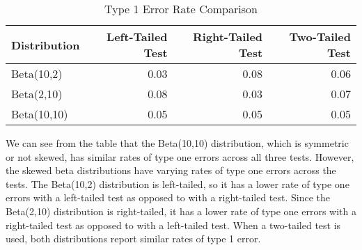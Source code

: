 \documentclass{article}\usepackage[]{graphicx}\usepackage[]{xcolor}
\begin{document}
\begin{enumerate}
\begin{enumerate}
\begin{table}[H]
\centering
\begingroup\small
\begin{tabular}{lrrr}
  \hline
Distribution & Left-Tailed Test & Right-Tailed Test & Two-Tailed Test \\ 
  \hline
Beta(10,2) & 0.03 & 0.08 & 0.06 \\ 
  Beta(2,10) & 0.08 & 0.03 & 0.07 \\ 
  Beta(10,10) & 0.05 & 0.05 & 0.05 \\ 
   \hline
\end{tabular}
\endgroup
\caption{Type 1 Error Rate Comparison} 
\end{table}

We can see from the table that the Beta(10,10) distribution, which is symmetric or not skewed, has similar rates of type one errors across all three tests. However, the skewed beta distributions have varying rates of type one errors across the tests. The Beta(10,2) distribution is left-tailed, so it has a lower rate of type one errors with a left-tailed test as opposed to with a right-tailed test. Since the Beta(2,10) distribution is right-tailed, it has a lower rate of type one errors with a right-tailed test as opposed to with a left-tailed test. When a two-tailed test is used, both distributions report similar rates of type 1 error.
  \end{enumerate}
\end{enumerate}

\end{document}
